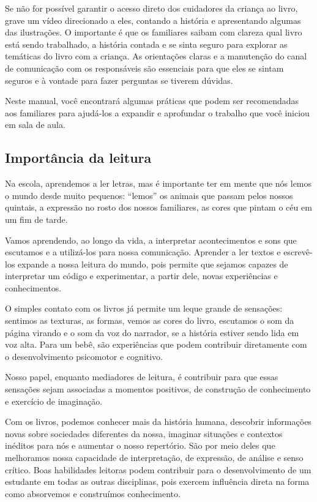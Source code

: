 \documentclass[11pt]{extarticle}
\begin{document}
Se não for possível garantir o acesso direto dos cuidadores da criança ao livro, 
grave um vídeo direcionado a eles, contando a história e apresentando algumas 
das ilustrações. O importante é que os familiares saibam com clareza qual livro 
está sendo trabalhado, a história contada e se sinta seguro para explorar as temáticas 
do livro com a criança. As orientações claras e a manutenção do canal de comunicação com 
os responsáveis são essenciais para que eles se sintam seguros e à vontade para fazer perguntas 
se tiverem dúvidas. 

Neste manual, você encontrará algumas práticas que podem ser 
recomendadas aos familiares para ajudá-los a expandir e aprofundar o trabalho 
que você iniciou em sala de aula.


\subsection{Importância da leitura}
Na escola, aprendemos a ler letras, mas é importante ter em mente que nós 
lemos o mundo desde muito pequenos: “lemos” os animais que passam pelos nossos 
quintais, a expressão no rosto dos nossos familiares, as cores que pintam o céu 
em um fim de tarde. 

Vamos aprendendo, ao longo da vida, a interpretar acontecimentos 
e sons que escutamos e a utilizá-los para nossa comunicação. Aprender a ler textos e 
escrevê-los expande a nossa leitura do mundo, pois permite que sejamos capazes de 
interpretar um código e experimentar, a partir dele, novas experiências e conhecimentos. 

O simples contato com os livros já permite um leque grande de sensações: 
sentimos as texturas, as formas, vemos as cores do livro, escutamos o som da página 
virando e o som da voz do narrador, se a história estiver sendo lida em voz alta. Para um 
bebê, são experiências que podem contribuir diretamente com o desenvolvimento psicomotor 
e cognitivo. 

Nosso papel, enquanto mediadores de leitura, é contribuir para que essas 
sensações sejam associadas a momentos positivos, de construção de 
conhecimento e exercício de imaginação. 

Com os livros, podemos conhecer mais da história humana, descobrir informações 
novas sobre sociedades diferentes da nossa, imaginar situações e contextos inéditos 
para nós e aumentar o nosso repertório. São por meio deles que melhoramos nossa 
capacidade de interpretação, de expressão, de análise e senso crítico. Boas habilidades 
leitoras podem contribuir para o desenvolvimento de um estudante em todas as outras 
disciplinas, pois exercem influência direta na forma como absorvemos e 
construímos conhecimento.
\end{document}
